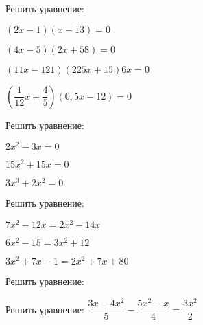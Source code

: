 %
\begin{class}[number=6]
	\begin{listofex}
		\item Решить уравнение:
		\begin{enumcols}[itemcolumns=2]
			\item \( (2x-1)(x-13)=0 \)
			\item \( (4x-5)(2x+58)=0 \)
			\item \( (11x-121)(225x+15)6x=0 \)
			\item \( \left( \dfrac{1}{12}x+\dfrac{4}{5} \right)(0,5x-12)=0 \)
		\end{enumcols}
		\item Решить уравнение:
		\begin{enumcols}[itemcolumns=3]
			\item \( 2x^2-3x=0 \)
			\item \( 15x^2+15x=0 \)
			\item \( 3x^3+2x^2=0 \)
		\end{enumcols}
		\item Решить уравнение:
		\begin{enumcols}[itemcolumns=2]
			\item {}
			\item \( 7x^2-12x=2x^2-14x \)
			\item \( 6x^2-15=3x^2+12 \)
			\item \( 3x^2+7x-1=2x^2+7x+80 \)
		\end{enumcols}
		\item Решить уравнение:
		\begin{enumcols}[itemcolumns=1]
			\item {}
			\item {}
		\end{enumcols}
		\item Решить уравнение: \( \dfrac{3x-4x^2}{5}-\dfrac{5x^2-x}{4}=\dfrac{3x^2}{2} \)
	\end{listofex}
\end{class}
%
%
